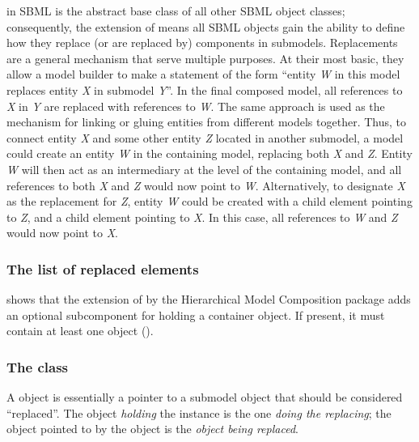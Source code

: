 \SBase in SBML is the abstract base class of all other SBML object classes; consequently, the extension of \SBase means all SBML objects gain the ability to define how they replace (or are replaced by) components in submodels. Replacements are a general mechanism that serve multiple purposes.  At their most basic, they allow a model builder to make a statement of the form ``entity \emph{W} in this model replaces entity \emph{X} in submodel \emph{Y}''.  In the final composed model, all references to \emph{X} in \emph{Y} are replaced with references to \emph{W}.  The same approach is used as the mechanism for linking or gluing entities from different models together.  Thus, to connect entity \emph{X} and some other entity \emph{Z} located in another submodel, a model could create  an entity \emph{W} in the containing model, replacing both \emph{X} and \emph{Z}.  Entity \emph{W} will then act as an intermediary at the level of the containing model, and all references to both \emph{X} and \emph{Z} would now point to \emph{W}.  Alternatively, to designate \emph{X} as the replacement for \emph{Z}, entity \emph{W} could be created with a child \ReplacedElement element pointing to \emph{Z}, and a child \ReplacedBy element pointing to \emph{X}.  In this case, all references to \emph{W} and \emph{Z} would now point to \emph{X}.


\subsubsection{The list of replaced elements}

 shows that the extension of \SBase by the Hierarchical Model Composition package adds an optional  subcomponent for holding a \ListOfReplacedElements container object.  If present, it must contain at least one \ReplacedElement object ().


\subsubsection{The  class}
\label{replacedelement-class}
\label{listofreplacedelements-class}

A \ReplacedElement object is essentially a pointer to a submodel object that should be considered ``replaced''.  The object \emph{holding} the \ReplacedElement instance is the one \emph{doing the replacing}; the object pointed to by the \ReplacedElement object is the \emph{object   being replaced}.

